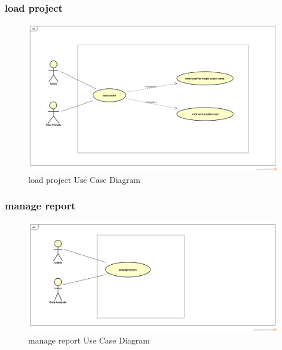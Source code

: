 \documentclass[12pt]{article}
\begin{document}
	 \subsubsection{load project}
	 	\begin{figure}[h]
	\centering
	\includegraphics[width=1.0\textwidth]{loadProject.png}
	\caption{load project Use Case Diagram}
	
	\end{figure}
\clearpage
\newpage
	 \subsubsection{manage report}
	 	\begin{figure}[h]
	 	\centering
	 	\includegraphics[width=1.0\textwidth]{manageReport.png}
	 	\caption{manage report Use Case Diagram}
	 	
	 \end{figure}
 \clearpage
 \newpage
\end{document}
